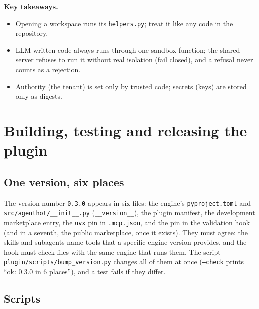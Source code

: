 \documentclass[10pt,a4paper]{article}
\newcommand{\code}[1]{\texttt{#1}}
\newcommand{\file}[1]{\texttt{#1}}
\newenvironment{takeaway}{%
  \begin{tcolorbox}[enhanced, breakable, colback=keybg, colframe=keybg, arc=0pt, boxrule=0pt,
     borderline west={2.2pt}{0pt}{keybar}, left=8pt, right=8pt, top=5pt, bottom=5pt,
     before skip=8pt, after skip=8pt]
  \textsf{\bfseries\color{keybar}Key takeaways.}\par\smallskip}{\end{tcolorbox}}
\begin{document}
\begin{takeaway}
\begin{itemize}
\item Opening a workspace runs its \file{helpers.py}; treat it like any code
in the repository.
\item LLM-written code always runs through one sandbox function; the shared
server refuses to run it without real isolation (fail closed), and a refusal
never counts as a rejection.
\item Authority (the tenant) is set only by trusted code; secrets (keys) are
stored only as digests.
\end{itemize}
\end{takeaway}

\section{Building, testing and releasing the plugin}\label{sec:engineering}

\subsection{One version, six places}

The version number \code{0.3.0} appears in six files: the engine's
\file{pyproject.toml} and \file{src/agenthot/\_\_init\_\_.py}
(\code{\_\_version\_\_}), the plugin manifest, the development marketplace
entry, the \code{uvx} pin in \file{.mcp.json}, and the pin in the validation
hook (and in a seventh, the public marketplace, once it exists). They must
agree: the skills and subagents name tools that a specific engine version
provides, and the hook must check files with the same engine that runs them.
The script \file{plugin/scripts/bump_version.py} changes all of them at once
(\code{--check} prints ``ok: 0.3.0 in 6 places''), and a test fails if they
differ.

\subsection{Scripts}
\end{document}
